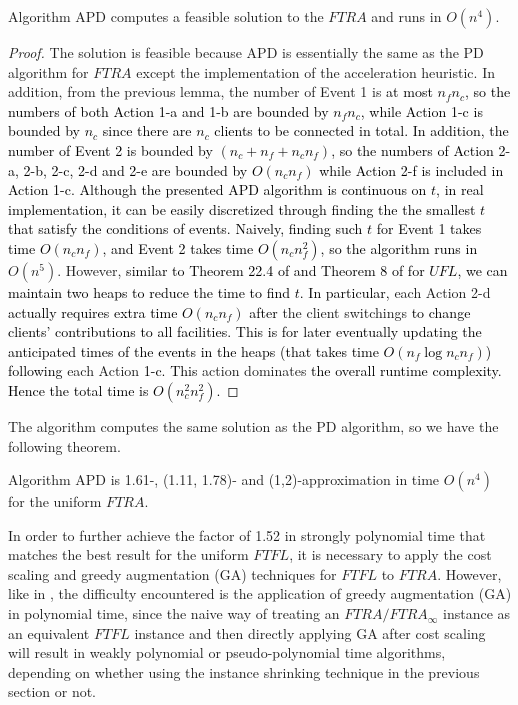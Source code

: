 \documentclass[10pt]{llncs}
\begin{document}
\begin{lemma}
Algorithm APD computes a feasible solution to the $FTRA$ and runs
in $O\left(n^{4}\right)$.\label{lem:time-SPD}\end{lemma}
\begin{proof}
The solution is feasible because APD is essentially the same as the
PD algorithm for $FTRA$ except the implementation of the acceleration
heuristic. In addition,\textcolor{black}{{} }from the previous lemma,
the number of Event 1 is \textcolor{black}{at most $n_{f}n_{c}$,
so the numbers of both Action 1-a and 1-b are bounded by $n_{f}n_{c}$,
while Action 1-c is bounded by $n_{c}$ since there are $n_{c}$ clients
to be connected in total. In addition, the number of Event 2 is bounded
by $\left(n_{c}+n_{f}+n_{c}n_{f}\right)$, so the numbers of Action
2-a, 2-b, 2-c, 2-d and 2-e are bounded by $O\left(n_{c}n_{f}\right)$
while Action 2-f is included in Action 1-c. Although the presented
APD algorithm is continuous on $t$, in real implementation, it can
be easily discretized through finding the the smallest $t$ that satisfy
the conditions of events. Naively, finding such $t$ for Event 1 takes
time $O\left(n_{c}n_{f}\right)$, and Event 2 takes time $O\left(n_{c}n_{f}^{2}\right)$,
so the algorithm runs in }$O\left(n^{5}\right)$. However, \textcolor{black}{similar
to Theorem 22.4 of \cite{JensVygenFL06Book} and Theorem 8 of \cite{jain01approximation}
for $UFL$, we can maintain two heaps to reduce the time to find $t$.
In particular,} each Action 2-d \textcolor{black}{actually requires
extra time $O\left(n_{c}n_{f}\right)$ after }the client switchings\textcolor{black}{{}
to change clients' contributions to all facilities. This is for later
eventually updating the anticipated times of the events in the heaps
(that takes time $O\left(n_{f}\log n_{c}n_{f}\right)$) following
}each Action \textcolor{black}{1-c. This} action dominates\textcolor{black}{{}
the overall runtime complexity. Hence the total time is $O\left(n_{c}^{2}n_{f}^{2}\right)$.}
\end{proof}
The algorithm computes the same solution as the PD algorithm, so we
have the following theorem.
\begin{theorem}
Algorithm APD is 1.61-, (1.11, 1.78)- and (1,2)-approximation in time
$O\left(n^{4}\right)$ for the uniform $FTRA$.
\end{theorem}
In order to further achieve the factor of 1.52 in strongly polynomial
time that matches the best result \cite{Swamy08FTFL2.076} for the
uniform $FTFL$, it is necessary to apply the cost scaling and greedy
augmentation (GA) techniques \cite{Swamy08FTFL2.076,Guha03FTFL2.41}
for $FTFL$ to $FTRA$. However, like in \cite{kewen2011cocoon,yan2011approximation},
the difficulty encountered is the application of greedy augmentation
(GA) in polynomial time, since the naive way of treating an $FTRA/FTRA_{\infty}$
instance as an equivalent $FTFL$ instance and then directly applying
GA after cost scaling will result in weakly polynomial or pseudo-polynomial
time algorithms, depending on whether using the instance shrinking
technique in the previous section or not. 
\end{document}
